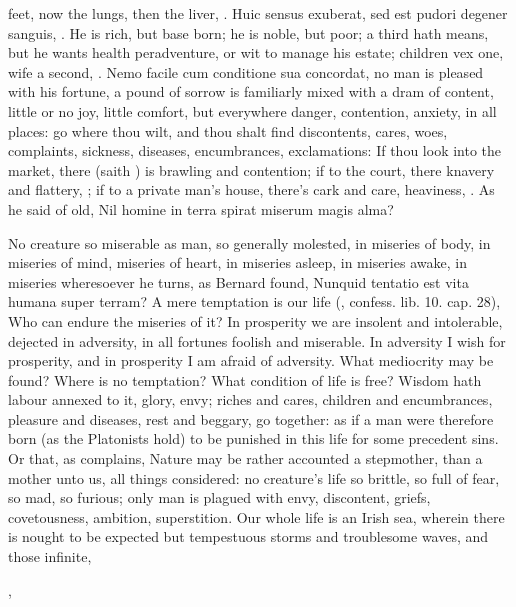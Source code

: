 {feet, now the lungs, then the liver, \etc{}. Huic sensus exuberat, sed est
pudori degener sanguis, \etc{}. He is rich, but base born; he is noble, but
poor; a third hath means, but he wants health peradventure, or wit to
manage his estate; children vex one, wife a second, \etc{}. Nemo facile cum
conditione sua concordat, no man is pleased with his fortune, a pound
of sorrow is familiarly mixed with a dram of content, little or no joy,
little comfort, but everywhere danger, contention, anxiety, in
all places: go where thou wilt, and thou shalt find discontents, cares,
woes, complaints, sickness, diseases, encumbrances, exclamations: If
thou look into the market, there (saith  \Chrysostom{}) is brawling
and contention; if to the court, there knavery and flattery, \etc{}; if to
a private man's house, there's cark and care, heaviness, \etc{}. As he said
of old,
Nil homine in terra spirat miserum magis alma?

No creature so miserable as man, so generally molested, in
miseries of body, in miseries of mind, miseries of heart, in miseries
asleep, in miseries awake, in miseries wheresoever he turns, as Bernard
found, Nunquid tentatio est vita humana super terram? A mere temptation
is our life (\Austin{}, confess. lib. 10. cap. 28),  Who can endure
the miseries of it? In prosperity we are insolent and
intolerable, dejected in adversity, in all fortunes foolish and
miserable. In adversity I wish for prosperity, and in prosperity
I am afraid of adversity. What mediocrity may be found? Where is no
temptation? What condition of life is free? Wisdom hath labour
annexed to it, glory, envy; riches and cares, children and
encumbrances, pleasure and diseases, rest and beggary, go together: as
if a man were therefore born (as the Platonists hold) to be punished in
this life for some precedent sins. Or that, as \Pliny{} complains,
Nature may be rather accounted a stepmother, than a mother unto us, all
things considered: no creature's life so brittle, so full of fear, so
mad, so furious; only man is plagued with envy, discontent, griefs,
covetousness, ambition, superstition. Our whole life is an Irish sea,
wherein there is nought to be expected but tempestuous storms and
troublesome waves, and those infinite,

,

}
